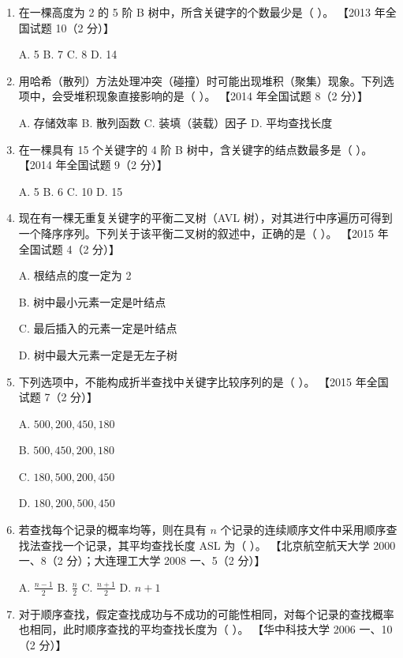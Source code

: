 \documentclass[lang=cn,newtx,10pt,scheme=chinese]{elegantbook}
\begin{document}
\begin{enumerate}
    \item 在一棵高度为 2 的 5 阶 B 树中，所含关键字的个数最少是（ ）。  
    【2013 年全国试题 10（2 分）】  

    A. 5 \quad B. 7 \quad C. 8 \quad D. 14  

    \item 用哈希（散列）方法处理冲突（碰撞）时可能出现堆积（聚集）现象。下列选项中，会受堆积现象直接影响的是（ ）。  
    【2014 年全国试题 8（2 分）】  

    A. 存储效率 \quad B. 散列函数 \quad C. 装填（装载）因子 \quad D. 平均查找长度  

    \item 在一棵具有 15 个关键字的 4 阶 B 树中，含关键字的结点数最多是（ ）。  
    【2014 年全国试题 9（2 分）】  

    A. 5 \quad B. 6 \quad C. 10 \quad D. 15  

    \item 现在有一棵无重复关键字的平衡二叉树（AVL 树），对其进行中序遍历可得到一个降序序列。下列关于该平衡二叉树的叙述中，正确的是（ ）。  
    【2015 年全国试题 4（2 分）】  

    A. 根结点的度一定为 2  

    B. 树中最小元素一定是叶结点  

    C. 最后插入的元素一定是叶结点  

    D. 树中最大元素一定是无左子树  

    \item 下列选项中，不能构成折半查找中关键字比较序列的是（ ）。  
    【2015 年全国试题 7（2 分）】  

    A. $500, 200, 450, 180$  

    B. $500, 450, 200, 180$  

    C. $180, 500, 200, 450$  

    D. $180, 200, 500, 450$  

    \item 若查找每个记录的概率均等，则在具有 $n$ 个记录的连续顺序文件中采用顺序查找法查找一个记录，其平均查找长度 ASL 为（ ）。  
    【北京航空航天大学 2000 一、8（2 分）；大连理工大学 2008 一、5（2 分）】  

    A. $\frac{n-1}{2}$ \quad B. $\frac{n}{2}$ \quad C. $\frac{n+1}{2}$ \quad D. $n+1$  

    \item 对于顺序查找，假定查找成功与不成功的可能性相同，对每个记录的查找概率也相同，此时顺序查找的平均查找长度为（ ）。  
    【华中科技大学 2006 一、10（2 分）】  


\end{enumerate}
\end{document}
